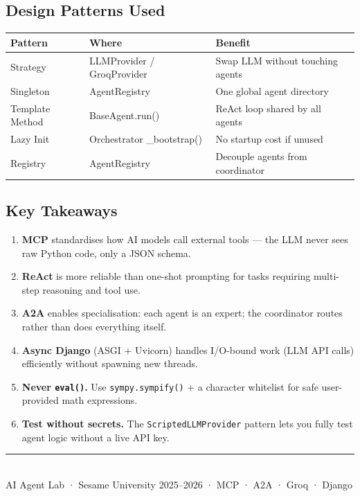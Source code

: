 \documentclass[11pt,a4paper]{article}
\begin{document}
\subsection{Design Patterns Used}

\begin{center}
\begin{tabularx}{\linewidth}{lXl}
\toprule
\textbf{Pattern} & \textbf{Where} & \textbf{Benefit} \\
\midrule
Strategy         & LLMProvider / GroqProvider      & Swap LLM without touching agents \\
Singleton        & AgentRegistry                   & One global agent directory \\
Template Method  & BaseAgent.run()                 & ReAct loop shared by all agents \\
Lazy Init        & Orchestrator \_bootstrap()      & No startup cost if unused \\
Registry         & AgentRegistry                   & Decouple agents from coordinator \\
\bottomrule
\end{tabularx}
\end{center}

\subsection{Key Takeaways}

\begin{successbox}
\begin{enumerate}[leftmargin=*, itemsep=2pt]
  \item \textbf{MCP} standardises how AI models call external tools — the LLM never
        sees raw Python code, only a JSON schema.
  \item \textbf{ReAct} is more reliable than one-shot prompting for tasks requiring
        multi-step reasoning and tool use.
  \item \textbf{A2A} enables specialisation: each agent is an expert; the coordinator
        routes rather than does everything itself.
  \item \textbf{Async Django} (ASGI + Uvicorn) handles I/O-bound work (LLM API calls)
        efficiently without spawning new threads.
  \item \textbf{Never \texttt{eval()}.} Use \texttt{sympy.sympify()} + a character
        whitelist for safe user-provided math expressions.
  \item \textbf{Test without secrets.} The \texttt{ScriptedLLMProvider} pattern lets
        you fully test agent logic without a live API key.
\end{enumerate}
\end{successbox}

\vspace{2cm}
\begin{center}
{\color{SesameNavy}\rule{0.5\linewidth}{1pt}}\\[0.5em]
{\small\color{gray}AI Agent Lab · Sesame University 2025--2026 · MCP · A2A · Groq · Django}
\end{center}
\end{document}
